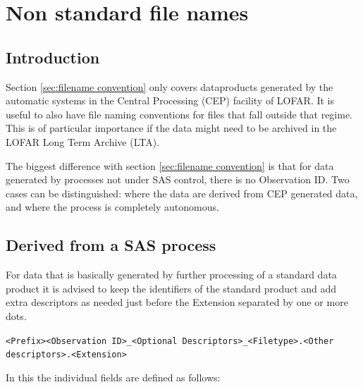 \documentclass[a4paper,10pt,bibtotoc]{scrartcl}
\begin{document}

\section{Non standard file names}
\label{sec:non standard file names}

\subsection{Introduction}

Section \ref{sec:filename convention} only covers dataproducts
generated by the automatic systems in the Central Processing (CEP)
facility of LOFAR. It is useful to also have file naming conventions
for files that fall outside that regime. This is of particular
importance if the data might need to be archived in the LOFAR Long
Term Archive (LTA).

The biggest difference with section \ref{sec:filename convention} is
that for data generated by processes not under SAS control, there is
no Observation ID. Two cases can be distinguished: where the data are
derived from CEP generated data, and where the process is completely
autonomous.

\subsection{Derived from a SAS process}

For data that is basically generated by further processing of a standard data product it is advised to keep the identifiers of the standard product and add extra descriptors as needed just before the Extension separated by one or more dots.

\begin{center}
  \verb|<Prefix><Observation ID>_<Optional Descriptors>_<Filetype>.<Other descriptors>.<Extension>|
\end{center}

In this the individual fields are defined as follows:
\end{document}
